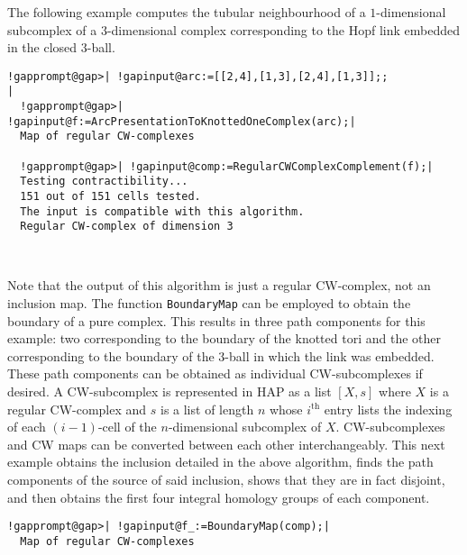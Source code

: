 \documentclass[a4paper,11pt]{report}
\begin{document}
{{ The following example computes the tubular neighbourhood of a $1$-dimensional subcomplex of a $3$-dimensional complex corresponding to the Hopf link embedded in the closed $3$-ball. 
\begin{Verbatim}[commandchars=!@|,fontsize=\small,frame=single,label=Example]
  !gapprompt@gap>| !gapinput@arc:=[[2,4],[1,3],[2,4],[1,3]];;            |
  !gapprompt@gap>| !gapinput@f:=ArcPresentationToKnottedOneComplex(arc);|
  Map of regular CW-complexes
  
  !gapprompt@gap>| !gapinput@comp:=RegularCWComplexComplement(f);|
  Testing contractibility...
  151 out of 151 cells tested.
  The input is compatible with this algorithm.
  Regular CW-complex of dimension 3
  
  
\end{Verbatim}
 Note that the output of this algorithm is just a regular CW-complex, not an
inclusion map. The function \texttt{BoundaryMap} can be employed to obtain the boundary of a pure complex. This results in
three path components for this example: two corresponding to the boundary of
the knotted tori and the other corresponding to the boundary of the $3$-ball in which the link was embedded. These path components can be obtained as
individual CW-subcomplexes if desired. A CW-subcomplex is represented in HAP
as a list $[X,s]$ where $X$ is a regular CW-complex and $s$ is a list of length $n$ whose $i^\textrm{th}$ entry lists the indexing of each $(i-1)$-cell of the $n$-dimensional subcomplex of $X$. CW-subcomplexes and CW maps can be converted between each other
interchangeably. This next example obtains the inclusion detailed in the above
algorithm, finds the path components of the source of said inclusion, shows
that they are in fact disjoint, and then obtains the first four integral
homology groups of each component. 
\begin{Verbatim}[commandchars=!@|,fontsize=\small,frame=single,label=Example]
  !gapprompt@gap>| !gapinput@f_:=BoundaryMap(comp);|
  Map of regular CW-complexes
  

\end{Verbatim}}}
\end{document}
